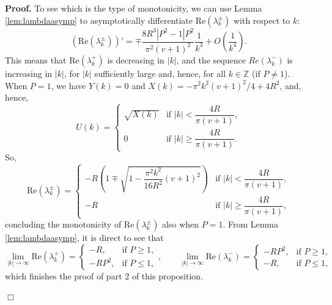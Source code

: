 \documentclass[a4paper]{article}
\def\Re{{\textrm{Re}}}
\numberwithin{equation}{section}
\newenvironment{pf}{\vspace{0.5em}\noindent\textbf{Proof.} }{\quad \hfill $\Box$ \\ \vspace{0.2em}\\}
\begin{document}
\begin{pf}
To see which is the type of monotonicity, we can use Lemma \ref{lem:lambdaasymp} to asymptotically differentiate $\Re(\lambda_k^{\pm})$ with respect to $k$:
\[
\left(\Re(\lambda_k^{\pm})\right)' = \mp \dfrac{8R^3|P^2-1|P^2}{\pi^2(v+1)^2}\dfrac{1}{k^3}+O\left(\dfrac{1}{k^4}\right).
\]
This means that $\Re(\lambda_k^+)$ is decreasing in $|k|$, and the sequence $Re(\lambda_k^-)$ is increasing in $|k|$, for $|k|$ sufficiently large and, hence, for all $k\in\mathbb{Z}$ (if $P\neq 1$). When $P=1$, we have $Y(k)=0$ and $X(k)= -{\pi^2 k^2}(v+1)^2/4+4R^2$, and, hence,
\[
U(k) =\begin{cases}
 \sqrt{X(k)} & \text{if } |k| <\dfrac{4R}{\pi (v+1)}, \\[7pt]
 0 & \text{if } |k| \geq\dfrac{4R}{\pi (v+1)}.
\end{cases}
\]
So,
\[
\Re(\lambda_k^{\pm}) =\begin{cases}
 -R\left( 1\mp\sqrt{1-\dfrac{\pi^2 k^2}{16 R^2}(v+1)^2}\right) & \text{if } |k| <\dfrac{4R}{\pi (v+1)}, \\[6pt]
 -R & \text{if } |k| \geq \dfrac{4R}{\pi (v+1)},
\end{cases}
\]
concluding the monotonicity of $\Re(\lambda_k^{\pm})$ also when $P=1$. From Lemma \ref{lem:lambdaasymp}, it is direct to see that
\[
\lim_{|k|\to\infty} \Re(\lambda_k^+)
=
\begin{cases}
 -R, & \text{if } P \geq 1, \\[6pt]
 -R P^2, & \text{if } P \leq 1 ,
\end{cases}
,\qquad
\lim_{|k|\to\infty} \Re(\lambda_k^-)
=
\begin{cases}
 -R P^2, & \text{if } P\geq 1, \\[7pt]
 -R, & \text{if } P\leq 1 ,
\end{cases}
\]
which finishes the proof of part 2 of this proposition.


\end{pf}
\end{document}
